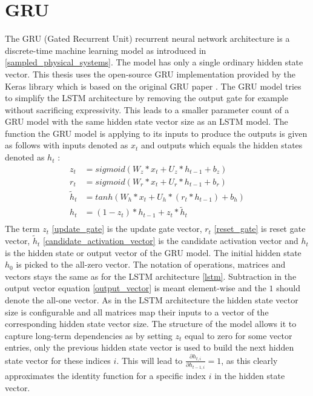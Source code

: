 \documentclass[draft,final]{vutinfth} %
\begin{document}
    \section{GRU} \label{gru}
    The GRU (Gated Recurrent Unit) recurrent neural network architecture is a discrete-time machine learning model as introduced in \ref{sampled_physical_systems}.
    The model has only a single ordinary hidden state vector.
    This thesis uses the open-source GRU implementation provided by the Keras library \cite{Keras} which is based on the original GRU paper \cite{GRU}.
    The GRU model tries to simplify the LSTM architecture by removing the output gate for example without sacrificing expressivity.
    This leads to a smaller parameter count of a GRU model with the same hidden state vector size as an LSTM model.
    The function the GRU model is applying to its inputs to produce the outputs is given as follows with inputs denoted as $x_t$ and outputs which equals the hidden states denoted as $h_t$ \cite[p. 4]{GRU}:
    \begin{align}
    \label{update_gate} z_t &= sigmoid(W_z*x_t + U_z*h_{t-1} + b_z) \\
    \label{reset_gate} r_t &= sigmoid(W_r*x_t + U_r*h_{t-1} + b_r) \\
    \label{candidate_activation_vector} \tilde{h}_t &= tanh(W_h*x_t + U_h*(r_t * h_{t-1}) + b_h) \\
    \label{output_vector} h_t &= (1 - z_t) * h_{t-1} + z_t * \tilde{h}_t \\
    \end{align}
    The term $z_t$ \ref{update_gate} is the update gate vector, $r_t$ \ref{reset_gate} is reset gate vector, $\tilde{h}_t$ \ref{candidate_activation_vector} is the candidate activation vector and $h_t$ is the hidden state or output vector of the GRU model.
    The initial hidden state $h_0$ is picked to the all-zero vector.
    The notation of operations, matrices and vectors stays the same as for the LSTM architecture \ref{lstm}.
    Subtraction in the output vector equation \ref{output_vector} is meant element-wise and the $1$ should denote the all-one vector.
    As in the LSTM architecture the hidden state vector size is configurable and all matrices map their inputs to a vector of the corresponding hidden state vector size.
    The structure of the model allows it to capture long-term dependencies as by setting $z_t$ equal to zero for some vector entries, only the previous hidden state vector is used to build the next hidden state vector for these indices $i$.
    This will lead to $\frac{\partial{h_{t,i}}}{\partial{h_{t-1,i}}} = 1$, as this clearly approximates the identity function for a specific index $i$ in the hidden state vector.
\end{document}
